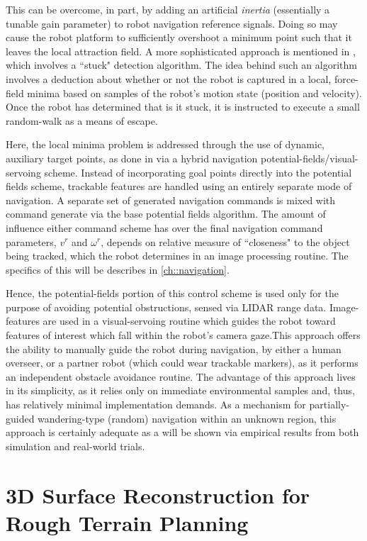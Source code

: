 		This can be overcome, in part, by adding an artificial \emph{inertia} (essentially a tunable gain parameter) to robot navigation reference signals. Doing so may cause the robot platform to sufficiently overshoot a minimum point such that it leaves the local attraction field. A more sophisticated approach is mentioned in \cite{Krishnamurthy2007}, which involves a ``stuck" detection algorithm. The idea behind such an algorithm involves a deduction about whether or not the robot is captured in a local, force-field minima based on samples of the robot’s motion state (\IE position and velocity). Once the robot has determined that is it stuck, it is instructed to execute a small random-walk as a means of escape. 

		Here, the local minima problem is addressed through the use of dynamic, auxiliary target points, as done in \cite{ArambulaCosio2004} via a hybrid navigation potential-fields/visual-servoing scheme. Instead of incorporating goal points directly into the potential fields scheme, trackable features are handled using an entirely separate mode of navigation. A separate set of generated navigation commands is mixed with command generate via the base potential fields algorithm. The amount of influence either command scheme has over the final navigation command parameters, $v^{r}$ and $\omega^{r}$, depends on relative measure of ``closeness" to the object being tracked, which the robot determines in an image processing routine. The specifics of this will be describes in \ref{ch::navigation}. 

		Hence, the potential-fields portion of this control scheme is used only for the purpose of avoiding potential obstructions, sensed via LIDAR range data. Image-features are used in a visual-servoing routine which guides the robot toward features of interest which fall within the robot’s camera gaze.This approach offers the ability to manually guide the robot during navigation, by either a human overseer, or a partner robot (which could wear trackable markers), as it performs an independent obstacle avoidance routine. The advantage of this approach lives in its simplicity, as it relies only on immediate environmental samples and, thus, has relatively minimal implementation demands.  As a mechanism for partially-guided wandering-type (random) navigation within an unknown region, this approach is certainly adequate as a will be shown via empirical results from both simulation and real-world trials.

		\section{3D Surface Reconstruction for Rough Terrain Planning}

